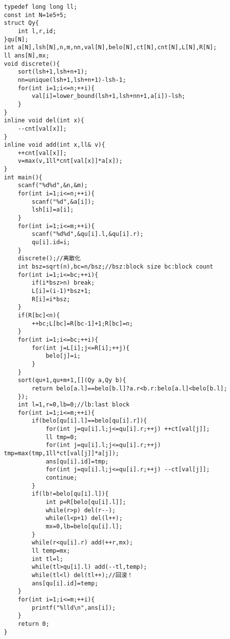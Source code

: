 \documentclass[UTF8]{ctexart}
\begin{document}
\begin{lstlisting}
typedef long long ll;
const int N=1e5+5;
struct Qy{
    int l,r,id;
}qu[N];
int a[N],lsh[N],n,m,nn,val[N],belo[N],ct[N],cnt[N],L[N],R[N];
ll ans[N],mx;
void discrete(){
    sort(lsh+1,lsh+n+1);
    nn=unique(lsh+1,lsh+n+1)-lsh-1;
    for(int i=1;i<=n;++i){
        val[i]=lower_bound(lsh+1,lsh+nn+1,a[i])-lsh;
    }
}
inline void del(int x){
    --cnt[val[x]];
}
inline void add(int x,ll& v){
    ++cnt[val[x]];
    v=max(v,1ll*cnt[val[x]]*a[x]);
}
int main(){
    scanf("%d%d",&n,&m);
    for(int i=1;i<=n;++i){
        scanf("%d",&a[i]);
        lsh[i]=a[i];
    }
    for(int i=1;i<=m;++i){
        scanf("%d%d",&qu[i].l,&qu[i].r);
        qu[i].id=i;
    }
    discrete();//离散化 
    int bsz=sqrt(n),bc=n/bsz;//bsz:block size bc:block count
    for(int i=1;i<=bc;++i){
        if(i*bsz>n) break;
        L[i]=(i-1)*bsz+1;
        R[i]=i*bsz;
    }
    if(R[bc]<n){
        ++bc;L[bc]=R[bc-1]+1;R[bc]=n;
    }
    for(int i=1;i<=bc;++i){
        for(int j=L[i];j<=R[i];++j){
            belo[j]=i;
        }
    }
    sort(qu+1,qu+m+1,[](Qy a,Qy b){
        return belo[a.l]==belo[b.l]?a.r<b.r:belo[a.l]<belo[b.l];
    });
    int l=1,r=0,lb=0;//lb:last block
    for(int i=1;i<=m;++i){
        if(belo[qu[i].l]==belo[qu[i].r]){
            for(int j=qu[i].l;j<=qu[i].r;++j) ++ct[val[j]];
            ll tmp=0;
            for(int j=qu[i].l;j<=qu[i].r;++j) tmp=max(tmp,1ll*ct[val[j]]*a[j]);
            ans[qu[i].id]=tmp;
            for(int j=qu[i].l;j<=qu[i].r;++j) --ct[val[j]];
            continue;
        }
        if(lb!=belo[qu[i].l]){
            int p=R[belo[qu[i].l]];
            while(r>p) del(r--);
            while(l<p+1) del(l++);
            mx=0,lb=belo[qu[i].l];
        }
        while(r<qu[i].r) add(++r,mx);
        ll temp=mx;
        int tl=l;
        while(tl>qu[i].l) add(--tl,temp);
        while(tl<l) del(tl++);//回滚！
        ans[qu[i].id]=temp; 
    }
    for(int i=1;i<=m;++i){
        printf("%lld\n",ans[i]);
    }
    return 0;
}
\end{lstlisting}
\end{document}
